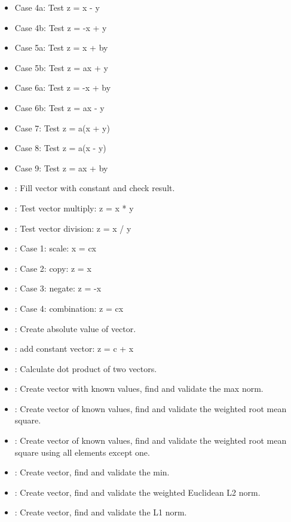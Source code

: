 \begin{itemize}
\item {} Case 4a: Test z =  x - y
\item {} Case 4b: Test z = -x + y
\item {} Case 5a: Test z =  x + by
\item {} Case 5b: Test z = ax + y
\item {} Case 6a: Test z = -x + by
\item {} Case 6b: Test z = ax - y
\item {} Case 7:  Test z = a(x + y)
\item {} Case 8:  Test z = a(x - y)
\item {} Case 9:  Test z = ax + by
\item {}: Fill vector with constant and check result.
\item {}: Test vector multiply: z = x * y
\item {}: Test vector division: z = x / y
\item {}: Case 1: scale: x = cx
\item {}: Case 2: copy: z = x
\item {}: Case 3: negate: z = -x
\item {}: Case 4: combination: z = cx
\item {}: Create absolute value of vector.
\item {}: add constant vector: z = c + x
\item {}: Calculate dot product of two vectors.
\item {}: Create vector with known values, find and validate the max norm.
\item {}: Create vector of known values, find and validate the weighted root mean square.
\item {}: Create vector of known values, find and validate the weighted root mean square using all elements except one.
\item {}: Create vector, find and validate the min.
\item {}: Create vector, find and validate the weighted Euclidean L2 norm.
\item {}: Create vector, find and validate the L1 norm.

\end{itemize}
